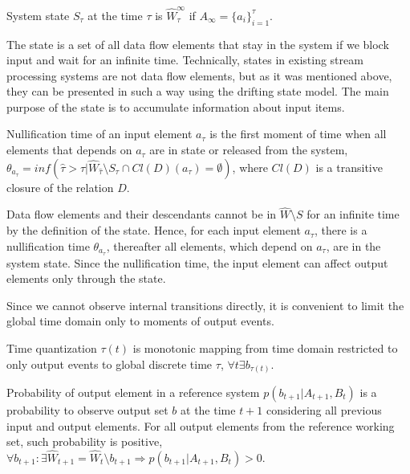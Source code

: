 
\begin{definition}{System state}
$S_\tau$ at the time $\tau$ is $\widehat{W}_\tau^{\infty}$ if $A_{\infty}=\{a_i\}^{\tau}_{i=1}$.
\end{definition}

The state is a set of all data flow elements that stay in the system if we block input and wait for an infinite time. Technically, states in existing stream processing systems are not data flow elements, but as it was mentioned above, they can be presented in such a way using the drifting state model. The main purpose of the state is to accumulate information about input items.

\begin{definition}{Nullification time}
of an input element $a_\tau$ is the first moment of time when all elements that depends on $a_\tau$ are in state or released from the system, $\theta_{a_\tau}=inf(\hat{\tau}>\tau|\widehat{W}_{\hat{\tau}}\setminus{S_{\hat{\tau}}}\cap{Cl(D)(a_\tau)=\emptyset})$, where $Cl(D)$ is a transitive closure of the relation $D$.
\end{definition}

Data flow elements and their descendants cannot be in $\widehat{W}\setminus{S}$ for an infinite time by the definition of the state. Hence, for each input element $a_\tau$, there is a nullification time $\theta_{a_\tau}$, thereafter all elements, which depend on $a_\tau$, are in the system state. Since the nullification time, the input element can affect output elements only through the state.

Since we cannot observe internal transitions directly, it is convenient to limit the global time domain only to moments of output events.

\begin{definition}{Time quantization}
$\tau(t)$ is monotonic mapping from time domain restricted to only output events to global discrete time $\tau$, $\forall{t}\exists{b_{\tau(t)}}$.
\end{definition}

\begin{definition}{Probability of output element in a reference system}
$p(b_{t+1}|A_{t+1}, B_t)$ is a probability to observe output set $b$ at the time $t+1$ considering all previous input and output elements. For all output elements from the reference working set, such probability is positive,\\
$\forall{b_{t+1}:\exists{\widehat{W}_{t+1}=\widehat{W}_{t}\setminus{b_{t+1}}}} \Rightarrow p(b_{t+1}|A_{t+1}, B_t) > 0$.
\end{definition}

